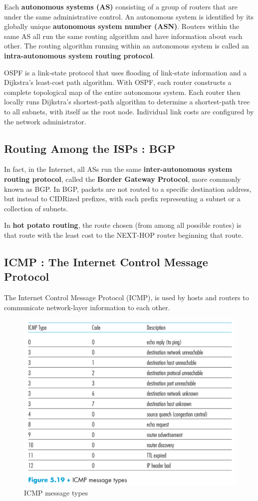 \documentclass[11pt]{article}
\begin{document}
Each \textbf{autonomous systems (AS)} consisting of a group of routers that are under the same administrative control. An autonomous system is identified by its globally unique \textbf{autonomous system number (ASN)}. Routers within the same AS all run the same routing algorithm and have information about each other. The routing algorithm running within an autonomous system is called an \textbf{intra-autonomous system routing protocol}.

OSPF is a link-state protocol that uses flooding of link-state information and a Dijkstra’s least-cost path algorithm. With OSPF, each router constructs a complete topological map of the entire autonomous system. Each router then locally runs Dijkstra’s shortest-path algorithm to determine a shortest-path tree to all subnets, with itself as the root node. Individual link costs are configured by the network administrator.

\subsection{Routing Among the ISPs : BGP}

In fact, in the Internet, all ASs run the same \textbf{inter-autonomous system routing protocol}, called the \textbf{Border Gateway Protocol}, more commonly known as BGP. In BGP, packets are not routed to a specific destination address, but instead to CIDRized prefixes, with each prefix representing a subnet or a collection of subnets.

In \textbf{hot potato routing}, the route chosen (from among all possible routes) is that route with the least cost to the NEXT-HOP router beginning that route. 

\subsection{ICMP : The Internet Control Message Protocol}

The Internet Control Message Protocol (ICMP), is used by hosts and routers to communicate network-layer information to each other. 

\begin{figure}[h]
	\centering
	\includegraphics[width=0.8\linewidth]{images/ICMP.png}
	\caption{ICMP message types}
	\label{fig:ICMP}
\end{figure}
\end{document}
